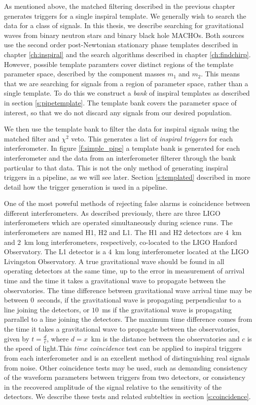 As mentioned above, the matched filtering described in the previous chapter
generates triggers for a single inspiral template. We generally wish to search
the data for a class of signals. In this thesis, we describe searching for
gravitational waves from binary neutron stars and binary black hole MACHOs.
Both sources use the second order post-Newtonian stationary phase templates
described in chapter \ref{ch:inspiral} and the search algorithms described in
chapter \ref{ch:findchirp}. However, possible template paramters cover
distinct regions of the template parameter space, described by the component
masses $m_1$ and $m_2$. This means that we are searching for signals from a 
region of parameter space, rather than a single template. To do this we
construct a \emph{bank} of inspiral templates as described in section
\ref{s:pipetemplate}. The template bank covers the parameter space of interest, so
that we do not discard any signals from our desired population.

We then use the template bank to filter the data for inspiral signals using
the matched filter and $\chi^2$ veto. This generates a list of \emph{inspiral
triggers} for each interferometer. In figure \ref{f:simple_pipe} a template
bank is generated for each interferometer and the data from an interferometer
filterer through the bank particular to that data. This is not the only method
of generating inspiral triggers in a pipeline, as we will see later. Section
\ref{s:templated} described in more detail how the trigger generation is used
in a pipeline.

One of the most poweful methods of rejecting false alarms is coincidence
between different interferometers. As described previously, there are three
LIGO interferometers which are operated simultaneously during science runs.
The interferometers are named H1, H2 and L1. The H1 and H2 detectors are
$4$~km and $2$~km long interferometers, respectively, co-located to the LIGO
Hanford Observatory. The L1 detector is a $4$~km long interferometer located
at the LIGO Livingston Observatory. A true gravitational wave should be found
in all operating detectors at the same time, up to the error in measurement of
arrival time and the time it takes a gravitational wave to propagate between
the observatories. The time difference between gravitational wave arrival time
may be between $0$~seconds, if the gravitational wave is propagating
perpendicular to a line joining the detectors, or $10$~ms if the gravitational
wave is propagating parrallel to a line joining the detectors. The maximum
time difference comes from the time it takes a gravitational wave to propagate
between the observatories, given by $t = \frac{d}{c}$, where $d = x$~km is the
distance between the observatories and $c$ is the speed of light.This
\emph{time coincidence} test can be applied to inspiral triggers from each
interferometer and is an excellent method of distinguishing real signals from
noise. Other coincidence tests may be used, such as demanding consistency of
the waveform parameters between triggers from two detectors, or consistency in
the recovered amplitude of the signal relative to the sensitivity of the
detectors. We describe these tests and related subtelties in section
\ref{s:coincidence}.

